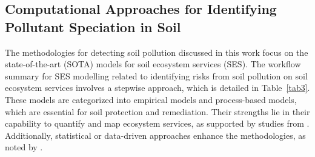 \documentclass[sn-mathphys-num]{sn-jnl}
\begin{document}
\subsection{Computational Approaches for Identifying Pollutant Speciation
    in Soil}\label{sec3.1}

The methodologies for detecting soil pollution discussed in this work focus on
the state-of-the-art (SOTA) models for soil ecosystem services (SES). The workflow summary for SES modelling related to identifying risks from soil pollution on soil ecosystem services involves a stepwise approach, which is
detailed in Table~\ref{tab3}. These
models are categorized into empirical models and process-based models, which
are essential for soil protection and remediation. Their strengths lie in
their capability to quantify and map ecosystem services, as supported by
studies from \cite{TeranGomez2025,ElSorogy2025,Lemenkova2020,Lemenkova2021,Sandu2025}.
Additionally, statistical or data-driven approaches enhance the methodologies,
as noted by \cite{Li2025a,Racic2025}.
\end{document}
